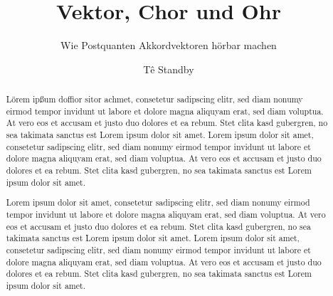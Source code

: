 \documentclass{../../vwa}
\begin{document}
\titlehead{Kopf}
\author{Tê Standby}
\publishers{Armin Windischhofer}
\subject{Mathematik}
\title{Vektor, Chor und Ohr}
\subtitle{Wie Postquanten Akkordvektoren hörbar machen}
\dedication{Für ``Nuttenzwerg".}

\begin{front}
\begin{abstract}
Lörem ipßum doffior sitor achmet, consetetur sadipscing elitr, sed diam nonumy eirmod tempor invidunt ut labore et dolore magna aliquyam erat, sed diam voluptua. At vero eos et accusam et justo duo dolores et ea rebum. Stet clita kasd gubergren, no sea takimata sanctus est Lorem ipsum dolor sit amet. Lorem ipsum dolor sit amet, consetetur sadipscing elitr, sed diam nonumy eirmod tempor invidunt ut labore et dolore magna aliquyam erat, sed diam voluptua. At vero eos et accusam et justo duo dolores et ea rebum. Stet clita kasd gubergren, no sea takimata sanctus est Lorem ipsum dolor sit amet.
\end{abstract}

\begin{abstract}
Lorem ipsum dolor sit amet, consetetur sadipscing elitr, sed diam nonumy eirmod tempor invidunt ut labore et dolore magna aliquyam erat, sed diam voluptua. At vero eos et accusam et justo duo dolores et ea rebum. Stet clita kasd gubergren, no sea takimata sanctus est Lorem ipsum dolor sit amet. Lorem ipsum dolor sit amet, consetetur sadipscing elitr, sed diam nonumy eirmod tempor invidunt ut labore et dolore magna aliquyam erat, sed diam voluptua. At vero eos et accusam et justo duo dolores et ea rebum. Stet clita kasd gubergren, no sea takimata sanctus est Lorem ipsum dolor sit amet.
\end{abstract}
\end{front}

\begin{main}

\end{main}

\begin{back}
\appendix
\end{back}
\end{document}
